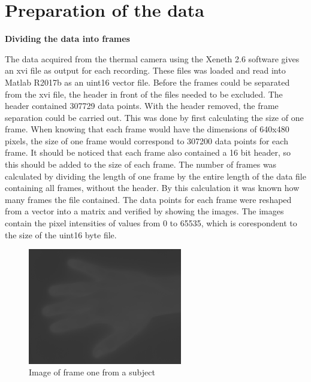 \chapter{Preparation of the data}

\textbf{Dividing the data into frames}

The data acquired from the thermal camera using the Xeneth 2.6 software gives an xvi file as output for each recording. These files was loaded and read into Matlab R2017b as an uint16 vector file. Before the frames could be separated from the xvi file, the header in front of the files needed to be excluded. The header contained 307729 data points. With the header removed, the frame separation could be carried out. This was done by first calculating the size of one frame. When knowing that each frame would have the dimensions of 640x480 pixels, the size of one frame would correspond to 307200 data points for each frame. It should be noticed that each frame also contained a 16 bit header, so this should be added to the size of each frame. The number of frames was calculated by dividing the length of one frame by the entire length of the data file containing all frames, without the header. By this calculation it was known how many frames the file contained. The data points for each frame were reshaped from a vector into a matrix and verified by showing the images. 
The images contain the pixel intensities of values from 0 to 65535, which is corespondent to the size of the uint16 byte file. 


\begin{figure}[H]
	\includegraphics[width=0.6\textwidth]{figures/uint16Hand}  %
	\caption{Image of frame one from a subject}
	\label{fig:hand}  %
\end{figure}